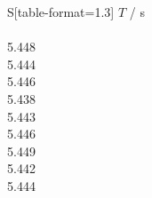 \begin{subtable}{0.18\textwidth}
\centering
{}
\label{tab:magnet3-0}
\begin{tabular}{S[table-format=1.3]}
\toprule
{$T$ / s} \\
 \\
5.448 \\
5.444 \\
5.446 \\
5.438 \\
5.443 \\
5.446 \\
5.449 \\
5.442 \\
5.444 \\
\bottomrule
\end{tabular}
\end{subtable}